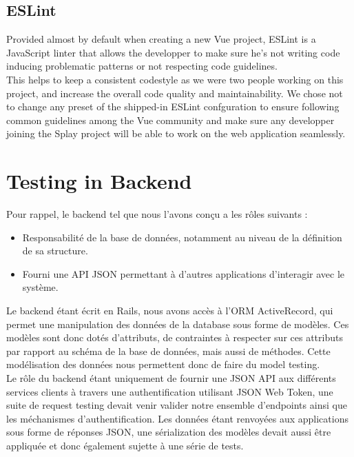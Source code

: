 \documentclass{eplmastersthesis}
\begin{document}
      \subsection{ESLint}

        Provided almost by default when creating a new Vue project, ESLint
        \cite{eslint} is a JavaScript linter that allows the developper to
        make sure he's not writing code inducing problematic patterns or not
        respecting code guidelines.\\
        This helps to keep a consistent codestyle as we were two people working
        on this project, and increase the overall code quality and
        maintainability. We chose not to change any preset of the shipped-in
        ESLint confguration to ensure following common guidelines among the Vue
        community and make sure any developper joining the Splay project will
        be able to work on the web application seamlessly.


    \section{Testing in Backend}

      Pour rappel, le backend tel que nous l'avons conçu a les rôles suivants :
      \begin{itemize}
        \item Responsabilité de la base de données, notamment au niveau de
        la définition de sa structure.
        \item Fourni une API JSON permettant à d'autres applications d'interagir
        avec le système.
      \end{itemize}

      Le backend étant écrit en Rails, nous avons accès à l'ORM ActiveRecord, qui
      permet une manipulation des données de la database sous forme de modèles.
      Ces modèles sont donc dotés d'attributs, de contraintes à respecter sur
      ces attributs par rapport au schéma de la base de données, mais aussi de
      méthodes. Cette modélisation des données nous permettent donc de faire
      du model testing.\\

      Le rôle du backend étant uniquement de fournir une JSON API
      aux différents services clients à travers une authentification utilisant
      JSON Web Token, une suite de request testing devait venir valider
      notre ensemble d'endpoints ainsi que les méchanismes d'authentification.
      Les données étant renvoyées aux applications sous forme de réponses
      JSON, une sérialization des modèles devait aussi être appliquée et donc
      également sujette à une série de tests.
\end{document}
